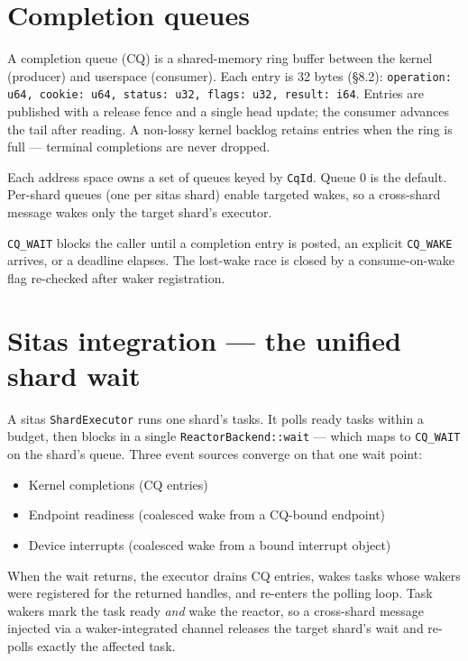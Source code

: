 \section{Completion queues}

A completion queue (CQ) is a shared-memory ring buffer between the kernel
(producer) and userspace (consumer). Each entry is 32 bytes (\S8.2):
\texttt{operation: u64, cookie: u64, status: u32, flags: u32, result: i64}.
Entries are published with a release fence and a single head update; the
consumer advances the tail after reading. A non-lossy kernel backlog retains
entries when the ring is full --- terminal completions are never dropped.

Each address space owns a set of queues keyed by \texttt{CqId}. Queue 0 is the
default. Per-shard queues (one per sitas shard) enable targeted wakes, so a
cross-shard message wakes only the target shard's executor.

\texttt{CQ\_WAIT} blocks the caller until a completion entry is posted, an
explicit \texttt{CQ\_WAKE} arrives, or a deadline elapses. The lost-wake race is
closed by a consume-on-wake flag re-checked after waker registration.

\section{Sitas integration --- the unified shard wait}

A sitas \texttt{ShardExecutor} runs one shard's tasks. It polls ready tasks
within a budget, then blocks in a single \texttt{ReactorBackend::wait} ---
which maps to \texttt{CQ\_WAIT} on the shard's queue. Three event sources
converge on that one wait point:

\begin{itemize}
    \item Kernel completions (CQ entries)
    \item Endpoint readiness (coalesced wake from a CQ-bound endpoint)
    \item Device interrupts (coalesced wake from a bound interrupt object)
\end{itemize}

When the wait returns, the executor drains CQ entries, wakes tasks whose wakers
were registered for the returned handles, and re-enters the polling loop. Task
wakers mark the task ready \emph{and} wake the reactor, so a cross-shard message
injected via a waker-integrated channel releases the target shard's wait and
re-polls exactly the affected task.


